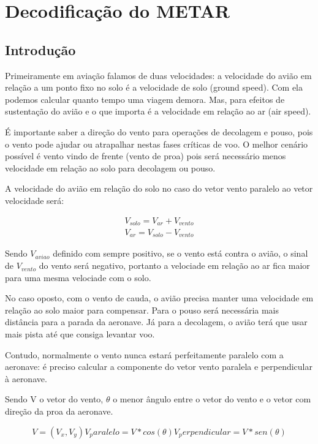 \chapter{Decodificação do METAR}
\section{Introdução}
Primeiramente em aviação falamos de duas velocidades: a velocidade do avião
 em relação a um ponto fixo no solo é a velocidade de solo (ground speed).
Com ela podemos calcular quanto tempo uma viagem demora. Mas, para efeitos de 
sustentação do avião e o que importa é a velocidade em relação ao ar (air speed). 

É importante saber a direção do vento para operações de decolagem e pouso,
pois o vento pode ajudar ou atrapalhar nestas fases críticas de voo.
O melhor cenário possível é vento vindo de frente (vento de proa) pois
será necessário menos velocidade em relação ao solo para decolagem ou 
pouso.

A velocidade do avião em relação do solo no caso do vetor vento 
paralelo ao vetor velocidade será:

\begin{align}
    V_{solo} = V_{ar} + V_{vento} \\
    V_{ar} = V_{solo} - V_{vento}
\end{align}

Sendo $V_{aviao}$ definido com sempre positivo, se o vento está 
contra o avião, o sinal de $V_{vento}$ do vento
será negativo, portanto a velociade em relação ao ar fica maior para
uma mesma velociade com o solo.

No caso oposto, com o vento de cauda, o avião precisa manter uma
velocidade em relação ao solo maior para compensar. Para o 
pouso será necessária mais distância para a parada da aeronave.
Já para a decolagem, o avião terá que usar mais pista até que
consiga levantar voo.

Contudo, normalmente o vento nunca estará perfeitamente paralelo
com a aeronave: é preciso calcular a componente do vetor vento 
paralela e perpendicular à aeronave.

Sendo V o vetor do vento, $\theta$ o menor ângulo entre o vetor 
do vento e o vetor com direção da proa da aeronave.


\begin{equation}
V = (V_x, V_y)
V_paralelo = V * cos(\theta)
V_perpendicular = V * sen(\theta)
\end{equation}

